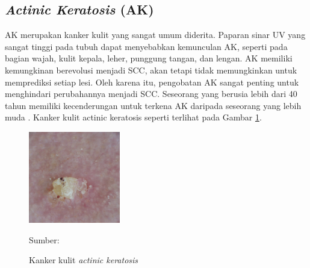     \subsection{\textit{Actinic Keratosis} (AK)}
    AK merupakan kanker kulit yang sangat umum diderita. Paparan sinar UV yang sangat tinggi pada tubuh dapat menyebabkan kemunculan AK, seperti pada bagian wajah, kulit kepala, leher, punggung tangan, dan lengan. AK memiliki kemungkinan berevolusi menjadi SCC, akan tetapi tidak memungkinkan untuk memprediksi setiap lesi. Oleh karena itu, pengobatan AK sangat penting untuk menghindari perubahannya menjadi SCC. Seseorang yang berusia lebih dari 40 tahun memiliki kecenderungan untuk terkena AK daripada seseorang yang lebih muda \citep{Dianzani2020}. Kanker kulit actinic keratosis seperti terlihat pada Gambar \ref{fig:ak}.
    \begin{figure}[H] 
        \begin{center} 
            \includegraphics[width=4cm]{../img/Skin Cancer AK - Latex.jpg}
            \caption{Kanker kulit \textit{actinic keratosis}} 
            \label{fig:ak}
            Sumber: \citep{Codella2018,Combalia2019,Tschandl2018}
        \end{center} 
    \end{figure}

